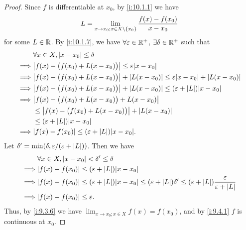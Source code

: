 \begin{proof}
  Since \(f\) is differentiable at \(x_0\), by \cref{i:10.1.1} we have
  \[
    L = \lim_{x \to x_0 ; x \in X \setminus \left\lbrace x_0\right\rbrace} \dfrac{f(x) - f(x_0)}{x - x_0}
  \]
  for some \(L \in \mathbb{R}\).
  By \cref{i:10.1.7}, we have \(\forall \varepsilon \in \mathbb{R}^+\), \(\exists \delta \in \mathbb{R}^+\) such that
  \begin{align*}
             & \forall x \in X, \abs{x - x_0} \leq \delta                                                                      \\
    \implies & \abs{f(x) - \big(f(x_0) + L(x - x_0)\big)} \leq \varepsilon \abs{x - x_0}                                       \\
    \implies & \abs{f(x) - \big(f(x_0) + L(x - x_0)\big)} + \abs{L(x - x_0)} \leq \varepsilon \abs{x - x_0} + \abs{L(x - x_0)} \\
    \implies & \abs{f(x) - \big(f(x_0) + L(x - x_0)\big)} + \abs{L(x - x_0)} \leq (\varepsilon + \abs{L}) \abs{x - x_0}        \\
    \implies & \abs{f(x) - \big(f(x_0) + L(x - x_0)\big) + L(x - x_0)}                                                         \\
             & \leq \abs{f(x) - \big(f(x_0) + L(x - x_0)\big)} + \abs{L(x - x_0)}                                              \\
             & \leq (\varepsilon + \abs{L}) \abs{x - x_0}                                                                      \\
    \implies & \abs{f(x) - f(x_0)} \leq (\varepsilon + \abs{L}) \abs{x - x_0}.
  \end{align*}
  Let \(\delta' = \min(\delta, \varepsilon / (\varepsilon + \left\lvert L\right\rvert))\).
  Then we have
  \begin{align*}
             & \forall x \in X, \abs{x - x_0} < \delta' \leq \delta                                                                                                                        \\
    \implies & \abs{f(x) - f(x_0)} \leq (\varepsilon + \abs{L}) \abs{x - x_0}                                                                                                              \\
    \implies & \abs{f(x) - f(x_0)} \leq (\varepsilon + \abs{L}) \abs{x - x_0} \leq (\varepsilon + \abs{L}) \delta' \leq (\varepsilon + \abs{L}) \dfrac{\varepsilon}{\varepsilon + \abs{L}} \\
    \implies & \abs{f(x) - f(x_0)} \leq \varepsilon.
  \end{align*}
  Thus, by \cref{i:9.3.6} we have \(\lim_{x \to x_0 ; x \in X} f(x) = f(x_0)\), and by \cref{i:9.4.1} \(f\) is continuous at \(x_0\).
\end{proof}

